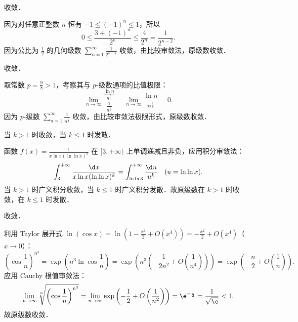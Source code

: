 \begin{solution}
     收敛．

    因为对任意正整数 $n$ 恒有 $-1 \leqslant (-1)^n \leqslant 1$，所以
    \begin{equation}
        0 \leqslant \frac{3 + (-1)^n}{2^n} \leqslant \frac{4}{2^n} = \frac{1}{2^{n-2}}.
    \end{equation}
    因为公比为 $\frac{1}{2}$ 的几何级数 $\sum_{n=1}^\infty \frac{1}{2^{n-2}}$ 收敛，由比较审敛法，原级数收敛．

     收敛．

    取常数 $p = \frac{9}{8} > 1$，考察其与 $p$-级数通项的比值极限：
    \begin{equation}
        \lim_{n\to\infty} \frac{\frac{\ln n}{n^{\frac{5}{4}}}}{\frac{1}{n^{\frac{9}{8}}}} = \lim_{n\to\infty} \frac{\ln n}{n^{\frac{1}{8}}} = 0.
    \end{equation}
    因为 $p$-级数 $\sum_{n=1}^\infty \frac{1}{n^{\frac{9}{8}}}$ 收敛，由比较审敛法极限形式，原级数收敛．

     当 $k > 1$ 时收敛，当 $k \leqslant 1$ 时发散．

    函数 $f(x) = \frac{1}{x \ln x (\ln\ln x)^k}$ 在 $[3, +\infty)$ 上单调递减且非负，应用积分审敛法：
    \begin{equation}
        \int_3^{+\infty} \frac{\d x}{x \ln x (\ln\ln x)^k} = \int_{\ln\ln 3}^{+\infty} \frac{\d u}{u^k} \quad (u = \ln\ln x).
    \end{equation}
    当 $k > 1$ 时广义积分收敛，当 $k \leqslant 1$ 时广义积分发散．故原级数在 $k > 1$ 时收敛，在 $k \leqslant 1$ 时发散．

     收敛．

    利用 Taylor 展开式 $\ln(\cos x) = \ln\left(1 - \frac{x^2}{2} + O(x^4)\right) = -\frac{x^2}{2} + O(x^4)$（$x \to 0$）：
    \begin{equation}
        \left(\cos \frac{1}{n}\right)^{n^3} = \exp\left( n^3 \ln\cos\frac{1}{n} \right) = \exp\left( n^3 \left( -\frac{1}{2n^2} + O\left(\frac{1}{n^4}\right) \right) \right) = \exp\left( -\frac{n}{2} + O\left(\frac{1}{n}\right) \right).
    \end{equation}
    应用 Cauchy 根值审敛法：
    \begin{equation}
        \lim_{n\to\infty} \sqrt[n]{\left(\cos \frac{1}{n}\right)^{n^3}} = \lim_{n\to\infty} \exp\left( -\frac{1}{2} + O\left(\frac{1}{n^2}\right) \right) = \e^{-\frac{1}{2}} = \frac{1}{\sqrt{\e}} < 1.
    \end{equation}
    故原级数收敛．


\end{solution}
